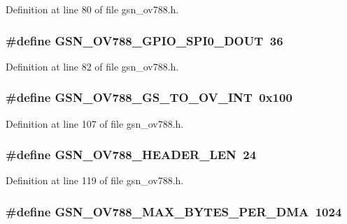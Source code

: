 Definition at line 80 of file gsn\_\-ov788.h.

\hypertarget{a00537_aa3b461392852b0d010ac54ff333c84d3}{
\subsubsection[{GSN\_\-OV788\_\-GPIO\_\-SPI0\_\-DOUT}]{\setlength{\rightskip}{0pt plus 5cm}\#define GSN\_\-OV788\_\-GPIO\_\-SPI0\_\-DOUT~36}}
\label{a00537_aa3b461392852b0d010ac54ff333c84d3}


Definition at line 82 of file gsn\_\-ov788.h.

\hypertarget{a00537_a2933565a79ef8d01d18fa21575e7289e}{
\subsubsection[{GSN\_\-OV788\_\-GS\_\-TO\_\-OV\_\-INT}]{\setlength{\rightskip}{0pt plus 5cm}\#define GSN\_\-OV788\_\-GS\_\-TO\_\-OV\_\-INT~0x100}}
\label{a00537_a2933565a79ef8d01d18fa21575e7289e}


Definition at line 107 of file gsn\_\-ov788.h.

\hypertarget{a00537_a442fd9e3b0731ad257cc101fe54c1626}{
\subsubsection[{GSN\_\-OV788\_\-HEADER\_\-LEN}]{\setlength{\rightskip}{0pt plus 5cm}\#define GSN\_\-OV788\_\-HEADER\_\-LEN~24}}
\label{a00537_a442fd9e3b0731ad257cc101fe54c1626}


Definition at line 119 of file gsn\_\-ov788.h.

\hypertarget{a00537_a34d25a484933f1f2e2f801ced7d31cb0}{
\subsubsection[{GSN\_\-OV788\_\-MAX\_\-BYTES\_\-PER\_\-DMA}]{\setlength{\rightskip}{0pt plus 5cm}\#define GSN\_\-OV788\_\-MAX\_\-BYTES\_\-PER\_\-DMA~1024}}
\label{a00537_a34d25a484933f1f2e2f801ced7d31cb0}


